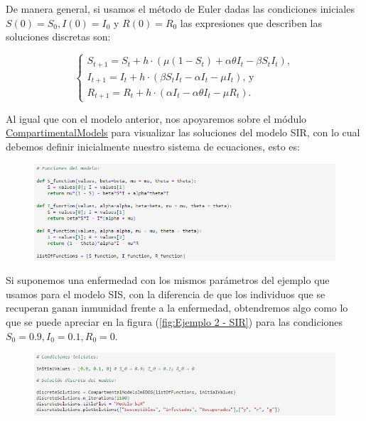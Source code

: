 De manera general, si usamos el método de Euler dadas las condiciones iniciales $S(0)=S_0,I(0)=I_0$ y $R(0)=R_0$ las expresiones que describen las soluciones discretas son:

$$\left\{\begin{array}{l}
S_{t+1} = S_t + h\cdot(\mu(1 - S_t) + \alpha\theta I_t - \beta S_t I_t), \\
I_{t+1} = I_t + h\cdot(\beta S_t I_t - \alpha I_t - \mu I_t)\text{, y} \\
R_{t+1} = R_t + h\cdot(\alpha I_t - \alpha\theta I_t - \mu R_t).
\end{array}\right.$$

Al igual que con el modelo anterior, nos apoyaremos sobre el módulo \href{https://github.com/Grupo-de-simulacion-con-automatas/Prediccion-del-comportamiento-de-una-enfermedad-simulada-en-AC-con-un-algoritmo-en-RN/blob/master/Codigo/1.\%20Modelos\%20compartimentales\%20en\%20ecuaciones\%20diferenciales.ipynb}{\underline{CompartimentalModels}} para visualizar las soluciones del modelo SIR, con lo cual debemos definir inicialmente nuestro sistema de ecuaciones, esto es:

\begin{figure}[h]
  \centering
    \includegraphics[width=1\textwidth]{Imagenes/compartimentalModels3.png}
\end{figure}

Si suponemos una enfermedad con los mismos parámetros del ejemplo que usamos para el modelo SIS, con la diferencia de que los individuos que se recuperan ganan inmunidad frente a la enfermedad, obtendremos algo como lo que se puede apreciar en la figura (\ref{fig:Ejemplo 2 - SIR}) para las condiciones $S_0=0.9,I_0=0.1,R_0=0$.


\begin{figure}[h]
  \centering
    \includegraphics[width=1\textwidth]{Imagenes/compartimentalModels4.png}
\end{figure}

